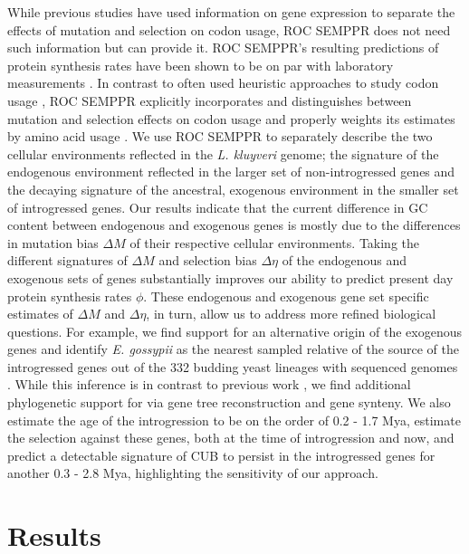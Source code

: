 \documentclass[doublespacing,linenumbers]{bmcart-modified}
\newcommand{\kluyveri}{\textit{L. kluyveri}\xspace}
\newcommand{\gossypii}{\textit{E. gossypii}\xspace}
\newcommand{\ROC}{ROC SEMPPR\xspace}
\newcommand{\GC}{GC content\xspace}
\newcommand{\DM}{\ensuremath{{\Delta M}}\xspace}
\newcommand{\DE}{\ensuremath{{\Delta \eta}}\xspace}
\begin{document}
While previous studies  have used information on gene expression to separate the effects of mutation and selection on codon usage, \ROC does not need such information but can provide it.
\ROC's resulting predictions of protein synthesis rates have been shown to be on par with laboratory measurements \citep{ShahAndGilchrist2011, gilchrist2015}.
In contrast to often used heuristic approaches to study codon usage \citep{sharp1987, Wright1990, dosreis2004}, \ROC explicitly incorporates and distinguishes between mutation and selection effects on codon usage and properly weights its estimates by amino acid usage \citep{cope2018}. %
We use \ROC to separately describe the two cellular environments reflected in the \kluyveri genome; the signature of the endogenous environment reflected in the larger set of non-introgressed genes and the decaying signature of the ancestral, exogenous environment in the smaller set of introgressed genes.
Our results indicate that the current difference in \GC between endogenous and exogenous genes is mostly due to the differences in mutation bias \DM of their respective cellular environments.
Taking the different signatures of \DM and selection bias \DE of the endogenous and exogenous sets of genes substantially improves our ability to predict present day protein synthesis rates $\phi$.
These endogenous and exogenous gene set specific estimates of \DM and \DE, in turn, allow us to address more refined biological questions.
For example, we find support for an alternative origin of the exogenous genes and identify \gossypii as the nearest sampled relative of the source of the introgressed genes out of the 332 budding yeast lineages with sequenced genomes \citep{shen2018}.
While this inference is in contrast to previous work \citep{payen2009, friedrich2015, vakirlis2016, brion2017}, we find additional phylogenetic support for via gene tree reconstruction and gene synteny.
We also estimate the age of the introgression to be on the order of 0.2 - 1.7 Mya, estimate the selection against these genes, both at the time of introgression and now, and predict a detectable signature of CUB to persist in the introgressed genes for another 0.3 - 2.8 Mya, highlighting the sensitivity of our approach.

\section*{Results}
\end{document}
